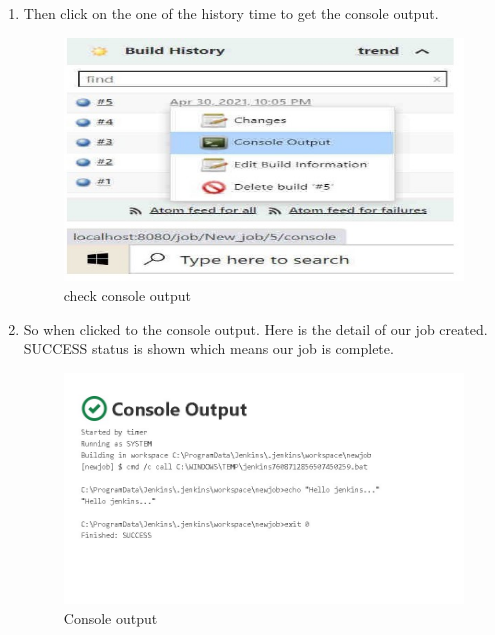 \documentclass[12pt]{article}
\begin{document}
\begin{enumerate}
\item Then click on the one of the history time to get the console output.

\begin{figure}[H]
\centering
\includegraphics[scale=0.6]{fig72}
\caption{check console output}
\vspace{0.6\baselineskip}
\end{figure}

\item So when clicked to the console output. Here is the detail of our job created. SUCCESS status is shown which means our job is complete.

\begin{figure}[H]
\centering
\includegraphics[scale=0.7]{fig73}
\caption{Console output}
\vspace{0.6\baselineskip}
\end{figure}

\end{enumerate}
\end{document}
